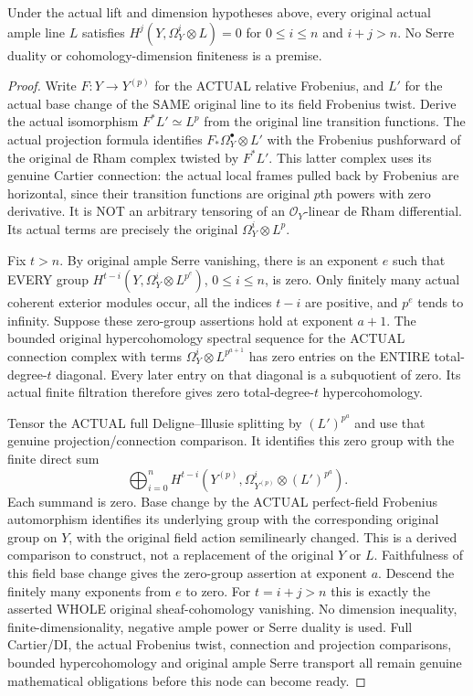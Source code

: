 \begin{lemma}
\label{lem:vanishing-charp-positive-ample}
\notready
Under the actual lift and dimension hypotheses above, every original
actual ample line $L$ satisfies
$H^j(Y,\Omega_Y^i\otimes L)=0$ for $0\le i\le n$ and $i+j>n$.
No Serre duality or cohomology-dimension finiteness is a premise.
\end{lemma}
\begin{proof}
Write $F:Y\to Y^{(p)}$ for the ACTUAL relative Frobenius, and $L'$ for
the actual base change of the SAME original line to its field Frobenius
twist. Derive the actual isomorphism $F^*L'\simeq L^p$ from the original
line transition functions. The actual projection formula identifies
$F_*\Omega_Y^\bullet\otimes L'$ with the Frobenius pushforward of the
original de Rham complex twisted by $F^*L'$. This latter complex uses
its genuine Cartier connection: the actual local frames pulled back by
Frobenius are horizontal, since their transition functions are original
$p$th powers with zero derivative. It is NOT an arbitrary tensoring of
an $\mathcal O_Y$-linear de Rham differential. Its actual terms are
precisely the original $\Omega_Y^i\otimes L^p$.

Fix $t>n$. By original ample Serre vanishing, there is an exponent $e$
such that EVERY group
$H^{t-i}(Y,\Omega_Y^i\otimes L^{p^e})$, $0\le i\le n$, is zero.
Only finitely many actual coherent exterior modules occur, all the
indices $t-i$ are positive, and $p^e$ tends to infinity. Suppose these
zero-group assertions hold at exponent $a+1$. The bounded original
hypercohomology spectral sequence for the ACTUAL connection complex
with terms $\Omega_Y^i\otimes L^{p^{a+1}}$ has zero entries on the
ENTIRE total-degree-$t$ diagonal. Every later entry on that diagonal
is a subquotient of zero. Its actual finite filtration therefore gives
zero total-degree-$t$ hypercohomology.

Tensor the ACTUAL full Deligne--Illusie splitting by $(L')^{p^a}$ and
use that genuine projection/connection comparison. It identifies this
zero group with the finite direct sum
\[
 \bigoplus_{i=0}^n
 H^{t-i}(Y^{(p)},\Omega_{Y^{(p)}}^i\otimes (L')^{p^a}).
\]
Each summand is zero. Base change by the ACTUAL perfect-field
Frobenius automorphism identifies its underlying group with the
corresponding original group on $Y$, with the original field action
semilinearly changed. This is a derived comparison to construct, not
a replacement of the original $Y$ or $L$. Faithfulness of this field
base change gives the zero-group assertion at exponent $a$. Descend
the finitely many exponents from $e$ to zero. For $t=i+j>n$ this is
exactly the asserted WHOLE original sheaf-cohomology vanishing.
No dimension inequality, finite-dimensionality, negative ample power
or Serre duality is used. Full Cartier/DI, the actual Frobenius twist,
connection and projection comparisons, bounded hypercohomology and
original ample Serre transport all remain genuine mathematical
obligations before this node can become ready.
\end{proof}

